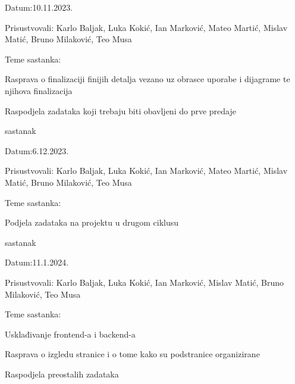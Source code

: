 \begin{packed_enum}
			\item[] \begin{packed_item}
				\item Datum:10.11.2023.
				\item Prisustvovali: Karlo Baljak, Luka Kokić, Ian Marković, Mateo Martić, Mislav Matić, Bruno Milaković, Teo Musa
				\item Teme sastanka:
				\begin{packed_item}
					\item  Rasprava o finalizaciji finijih detalja vezano uz obrasce uporabe i dijagrame te njihova finalizacija
					\item  Raspodjela zadataka koji trebaju biti obavljeni do prve predaje
				\end{packed_item}
			\end{packed_item}
			
			\item  sastanak
			
			\item[] \begin{packed_item}
				\item Datum:6.12.2023.
				\item Prisustvovali: Karlo Baljak, Luka Kokić, Ian Marković, Mateo Martić, Mislav Matić, Bruno Milaković, Teo Musa
				\item Teme sastanka:
				\begin{packed_item}
					\item  Podjela zadataka na projektu u drugom ciklusu
				\end{packed_item}
			\end{packed_item}
			
			\item  sastanak
			
			\item[] \begin{packed_item}
				\item Datum:11.1.2024.
				\item Prisustvovali: Karlo Baljak, Luka Kokić, Ian Marković, Mislav Matić, Bruno Milaković, Teo Musa
				\item Teme sastanka:
				\begin{packed_item}
					\item  Usklađivanje frontend-a i backend-a
					\item  Rasprava o izgledu stranice i o tome kako su podstranice organizirane
					\item  Raspodjela preostalih zadataka
				\end{packed_item}
			\end{packed_item}
			
			
		\end{packed_enum}
		
